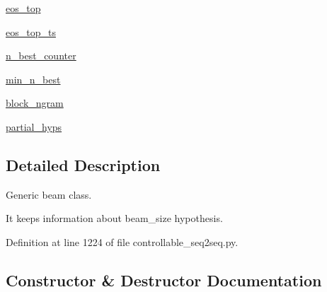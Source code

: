 \begin{DoxyCompactItemize}
\item 
\hyperlink{classprojects_1_1controllable__dialogue_1_1controllable__seq2seq_1_1controllable__seq2seq_1_1Beam_a573e769dffdbb74a1861abccd82acc34}{eos\+\_\+top}
\item 
\hyperlink{classprojects_1_1controllable__dialogue_1_1controllable__seq2seq_1_1controllable__seq2seq_1_1Beam_a68801372f27ac9fe8663322114a5f016}{eos\+\_\+top\+\_\+ts}
\item 
\hyperlink{classprojects_1_1controllable__dialogue_1_1controllable__seq2seq_1_1controllable__seq2seq_1_1Beam_af76a4cb47c1e4b9dc267f34821ab81d9}{n\+\_\+best\+\_\+counter}
\item 
\hyperlink{classprojects_1_1controllable__dialogue_1_1controllable__seq2seq_1_1controllable__seq2seq_1_1Beam_ad715f2d5f641843da30a95933c522384}{min\+\_\+n\+\_\+best}
\item 
\hyperlink{classprojects_1_1controllable__dialogue_1_1controllable__seq2seq_1_1controllable__seq2seq_1_1Beam_a6f281e607c65ed2d1ba434f64d6577d9}{block\+\_\+ngram}
\item 
\hyperlink{classprojects_1_1controllable__dialogue_1_1controllable__seq2seq_1_1controllable__seq2seq_1_1Beam_a58867f3a37a03b4d8904b09035352534}{partial\+\_\+hyps}
\end{DoxyCompactItemize}


\subsection{Detailed Description}
\begin{DoxyVerb}Generic beam class.

It keeps information about beam_size hypothesis.
\end{DoxyVerb}
 

Definition at line 1224 of file controllable\+\_\+seq2seq.\+py.



\subsection{Constructor \& Destructor Documentation}
\mbox{\label{classprojects_1_1controllable__dialogue_1_1controllable__seq2seq_1_1controllable__seq2seq_1_1Beam_ad750b2491841b08785706eb6e8fff097}} 
